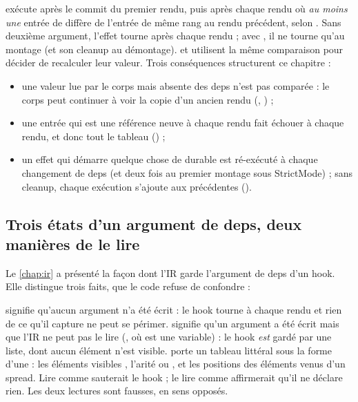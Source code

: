 \begin{react}
 exécute  après le commit du premier rendu, puis après chaque rendu où \emph{au moins une} entrée de  diffère de l'entrée de même rang au rendu précédent, selon . Sans deuxième argument, l'effet tourne après chaque rendu ; avec \code{[]}, il ne tourne qu'au montage (et son cleanup au démontage).  et  utilisent la même comparaison pour décider de recalculer leur valeur. Trois conséquences structurent ce chapitre :
\begin{itemize}
  \item une valeur lue par le corps mais absente des deps n'est pas comparée : le corps peut continuer à voir la copie d'un ancien rendu (, ) ;
  \item une entrée qui est une référence neuve à chaque rendu fait échouer  à chaque rendu, et donc tout le tableau () ;
  \item un effet qui démarre quelque chose de durable est ré-exécuté à chaque changement de deps (et deux fois au premier montage sous StrictMode) ; sans cleanup, chaque exécution s'ajoute aux précédentes ().
\end{itemize}
\end{react}

\subsection{Trois états d'un argument de deps, deux manières de le lire}

Le \cref{chap:ir} a présenté la façon dont l'IR garde l'argument de deps d'un hook. Elle distingue trois faits, que le code refuse de confondre :


 signifie qu'aucun argument n'a été écrit : le hook tourne à chaque rendu et rien de ce qu'il capture ne peut se périmer.  signifie qu'un argument a été écrit mais que l'IR ne peut pas le lire (, où  est une variable) : le hook \emph{est} gardé par une liste, dont aucun élément n'est visible.  porte un tableau littéral sous la forme d'une  : les éléments visibles , l'arité  ou , et les positions  des éléments venus d'un spread. Lire  comme  sauterait le hook ; le lire comme \code{[]} affirmerait qu'il ne déclare rien. Les deux lectures sont fausses, en sens opposés.

